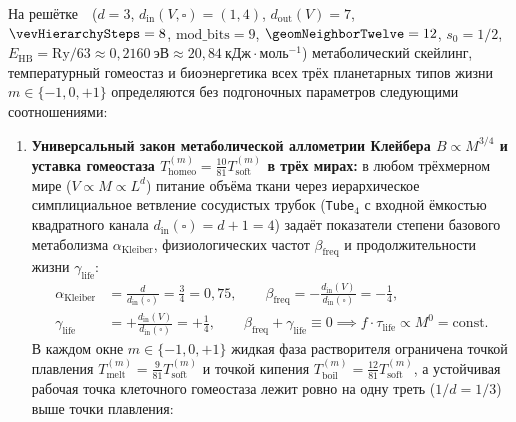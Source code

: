 \begin{theorem}
\label{thm:bio-allometry-atp-and-kinetics}
На решётке~\latGCKshort\ ($d=3$, $d_{\mathrm{in}}(V,\square)=(1,4)$, $d_{\mathrm{out}}(V)=7$, $\vevHierarchySteps=8$, $\mathrm{mod\_bits}=9$, $\geomNeighborTwelve=12$, $s_0=1/2$, $E_{\mathrm{HB}} = \mathrm{Ry}/63 \approx 0{,}2160\ \text{эВ} \approx 20{,}84\ \text{кДж}\cdot\text{моль}^{-1}$) метаболический скейлинг, температурный гомеостаз и биоэнергетика всех трёх планетарных типов жизни $m\in\{-1,0,+1\}$ определяются без подгоночных параметров следующими соотношениями:
\begin{enumerate}[leftmargin=*]
\item \textbf{Универсальный закон метаболической аллометрии Клейбера $B \propto M^{3/4}$ и уставка гомеостаза $T_{\mathrm{homeo}}^{(m)} = \frac{10}{81}T_{\mathrm{soft}}^{(m)}$ в трёх мирах:}
  в любом трёхмерном мире ($V\propto M\propto L^d$) питание объёма ткани через иерархическое симплициальное ветвление сосудистых трубок (\texttt{Tube}$_4$ с входной ёмкостью квадратного канала $d_{\mathrm{in}}(\square) = d + 1 = 4$) задаёт показатели степени базового метаболизма $\alpha_{\mathrm{Kleiber}}$, физиологических частот $\beta_{\mathrm{freq}}$ и продолжительности жизни $\gamma_{\mathrm{life}}$:
  \begin{equation}
  \label{eq:bio-kleiber-allometry-exponents}
  \begin{aligned}
    \alpha_{\mathrm{Kleiber}} &= \frac{d}{d_{\mathrm{in}}(\square)} = \frac{3}{4} = 0{,}75,\qquad
    \beta_{\mathrm{freq}} = -\frac{d_{\mathrm{in}}(V)}{d_{\mathrm{in}}(\square)} = -\frac{1}{4},\\
    \gamma_{\mathrm{life}} &= +\frac{d_{\mathrm{in}}(V)}{d_{\mathrm{in}}(\square)} = +\frac{1}{4},\qquad
    \beta_{\mathrm{freq}} + \gamma_{\mathrm{life}} \equiv 0 \implies f\cdot \tau_{\mathrm{life}} \propto M^0 = \mathrm{const}.
  \end{aligned}
  \end{equation}
  В каждом окне $m\in\{-1,0,+1\}$ жидкая фаза растворителя ограничена точкой плавления $T_{\mathrm{melt}}^{(m)} = \frac{9}{81}T_{\mathrm{soft}}^{(m)}$ и точкой кипения $T_{\mathrm{boil}}^{(m)} = \frac{12}{81}T_{\mathrm{soft}}^{(m)}$, а устойчивая рабочая точка клеточного гомеостаза лежит ровно на одну треть ($1/d = 1/3$) выше точки плавления:
  \begin{equation}
  \label{eq:bio-homeothermy-setpoint}

\end{equation}
\end{enumerate}
\end{theorem}
